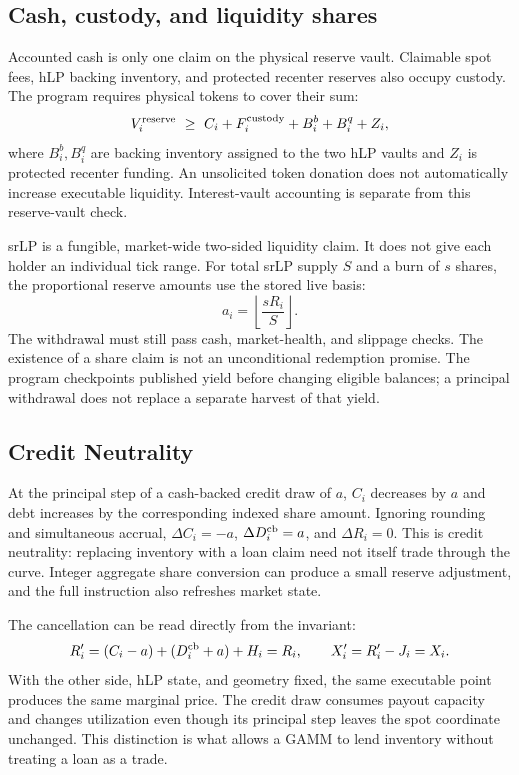 \subsection{Cash, custody, and liquidity shares}

Accounted cash is only one claim on the physical reserve vault. Claimable spot fees, hLP backing inventory, and protected recenter reserves also occupy custody. The program requires physical tokens to cover their sum:
\begin{equation}
V_i^{\rm reserve}\ \ge\ C_i+F_i^{\rm custody}+B_i^b+B_i^q+Z_i,
\label{eq:custody}
\end{equation}
where $B_i^b,B_i^q$ are backing inventory assigned to the two hLP vaults and $Z_i$ is protected recenter funding. An unsolicited token donation does not automatically increase executable liquidity. Interest-vault accounting is separate from this reserve-vault check.

srLP is a fungible, market-wide two-sided liquidity claim. It does not give each holder an individual tick range. For total srLP supply $S$ and a burn of $s$ shares, the proportional reserve amounts use the stored live basis:
\begin{equation}
a_i=\left\lfloor\frac{sR_i}{S}\right\rfloor.
\label{eq:srlp}
\end{equation}
The withdrawal must still pass cash, market-health, and slippage checks. The existence of a share claim is not an unconditional redemption promise. The program checkpoints published yield before changing eligible balances; a principal withdrawal does not replace a separate harvest of that yield.

\subsection{Credit Neutrality}

At the principal step of a cash-backed credit draw of $a$, $C_i$ decreases by $a$ and debt increases by the corresponding indexed share amount. Ignoring rounding and simultaneous accrual, $\Delta C_i=-a$, $\Delta D_i^{\rm cb}=a$, and $\Delta R_i=0$. This is credit neutrality: replacing inventory with a loan claim need not itself trade through the curve. Integer aggregate share conversion can produce a small reserve adjustment, and the full instruction also refreshes market state.

The cancellation can be read directly from the invariant:
\begin{equation}
R_i'=(C_i-a)+(D_i^{\rm cb}+a)+H_i=R_i,
\qquad X_i'=R_i'-J_i=X_i.
\end{equation}
With the other side, hLP state, and geometry fixed, the same executable point produces the same marginal price. The credit draw consumes payout capacity and changes utilization even though its principal step leaves the spot coordinate unchanged. This distinction is what allows a GAMM to lend inventory without treating a loan as a trade.

